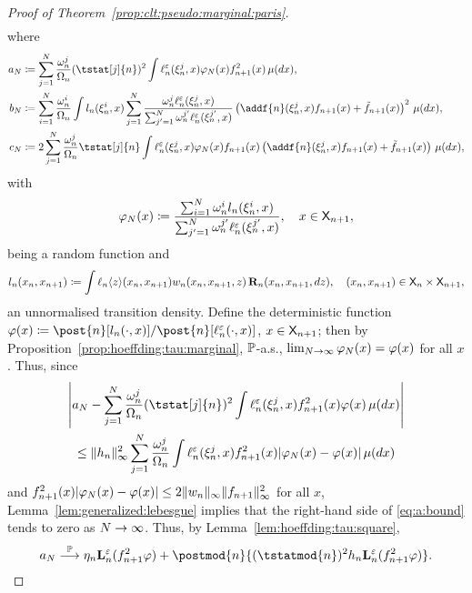 \begin{proof}[Proof of Theorem~\ref{prop:clt:pseudo:marginal:paris}]
\begin{align}
\end{align}
where
\begin{align*}
a_\N &\eqdef \sum_{j = 1}^\N \frac{\ewght{n}{j}}{\sumwght{n}}(\tstat[j]{n})^2  \int \udmod{n} (\epart{n}{j}, x) \varphi_\N(x) f_{n + 1}^2(x) \, \mu(\rmd x), \\
b_\N &\eqdef \sum_{i = 1}^\N \frac{\ewght{n}{i}}{\sumwght{n}} \int \lwd{n}(\epart{n}{i}, x) \sum_{j = 1}^\N \frac{\ewght{n}{j} \udmod{n} (\epart{n}{j}, x)}{\sum_{j' = 1}^{\N} \ewght{n}{j'} \udmod{n} (\epart{n}{j'}, x) }\left( \addf{n}(\epart{n}{j}, x) f_{n + 1}(x) + \ftd{n + 1}(x) \right)^2 \, \mu(\rmd x), \\
c_\N &\eqdef  2 \sum_{j = 1}^\N \frac{\ewght{n}{j}}{\sumwght{n}} \tstat[j]{n} \int  \udmod{n}(\epart{n}{j}, x) \varphi_N(x) f_{n + 1}(x) \left( \addf{n}(\epart{n}{j}, x) f_{n + 1}(x) + \ftd{n + 1}(x) \right) \, \mu(\rmd x),
\end{align*}
with 
$$
\varphi_N(x) \coloneqq \frac{\sum_{i = 1}^N \omega_{n}^{i} l_{n}(\xi_{n}^{i}, x)}{\sum_{j' = 1}^N \omega_{n}^{j'} \ell^\varepsilon_{n}(\xi_{n}^{j'}, x)}, \quad x \in \mathsf{X}_{n + 1},   
$$
being a random function and 
$$
l_{n}(x_n, x_{n + 1}) \coloneqq \int \ell_{n} \langle z \rangle(x_n, x_{n + 1}) w_{n}(x_n, x_{n + 1}, z) \, \mathbf{R}_{n}(x_n, x_{n + 1}, d z), \quad (x_n, x_{n + 1}) \in \mathsf{X}_n \times \mathsf{X}_{n + 1},  
$$
an unnormalised transition density. Define the deterministic function $\varphi(x) \eqdef \post{n}[\lwd{n}(\cdot, x)] / \post{n}[\udmod{n}(\cdot, x)]$, $x \in \mathsf{X}_{n + 1}$; then by Proposition~\ref{prop:hoeffding:tau:marginal}, $\mathbb{P}$-a.s., $\lim_{N \to \infty} \varphi_N(x) = \varphi(x)$ for all $x$. Thus, since 
\begin{multline} \label{eq:a:bound}
\left| a_\N -  \sum_{j = 1}^\N \frac{\ewght{n}{j}}{\sumwght{n}}(\tstat[j]{n})^2 \int \udmod{n}(\epart{n}{j}, x) f_{n + 1}^2(x) \varphi(x) \, \mu(\rmd x) \right| \\
\leq \| h_n \|^2_\infty \sum_{j = 1}^\N \frac{\ewght{n}{j}}{\sumwght{n}} \int \udmod{n}(\epart{n}{j}, x) f_{n + 1}^2(x) |\varphi_\N(x) - \varphi(x)| \, \mu(\rmd x)   
\end{multline}
and $f_{n + 1}^2(x) |\varphi_N(x) - \varphi(x)| \leq 2 \| w_{n} \|_\infty \| f_{n + 1} \|_\infty^2$ for all $x$, Lemma~\ref{lem:generalized:lebesgue} implies that the right-hand side of \eqref{eq:a:bound} tends to zero as $N \to \infty$. Thus, 
by Lemma~\ref{lem:hoeffding:tau:square},
\[
a_\N \pplim \eta_n \ukmod{n}(f^2_{n + 1} \varphi)  + \postmod{n} \{ (\tstatmod{n})^2 h_n \ukmod{n}(f^2_{n + 1} \varphi) \}.
\]


\end{proof}
